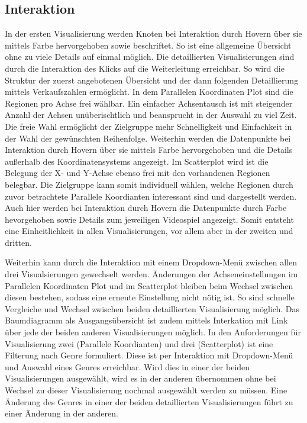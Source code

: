 \documentclass[usegeometry=true]{scrartcl}
\begin{document}
\subsection{Interaktion}
In der ersten Visualisierung werden Knoten bei Interaktion durch Hovern über sie mittels Farbe hervorgehoben sowie beschriftet. 
So ist eine allgemeine Übersicht ohne zu viele Details auf einmal möglich.
Die detaillierten Visualisierungen sind durch die Interaktion des Klicks auf die Weiterleitung erreichbar.
So wird die Struktur der zuerst angebotenen Übersicht und der dann folgenden Detaillierung mittels Verkaufszahlen ermöglicht. 
In dem Parallelen Koordinaten Plot sind die Regionen pro Achse frei wählbar. 
Ein einfacher Achsentausch ist mit steigender Anzahl der Achsen unüberischtlich und beansprucht in der Auswahl zu viel Zeit.
Die freie Wahl ermöglicht der Zielgruppe mehr Schnelligkeit und Einfachkeit in der Wahl der gewünschten Reihenfolge. 
Weiterhin werden die Datenpunkte bei Interaktion durch Hovern über sie mittels Farbe hervorgehoben und die Details außerhalb des Koordinatensystems angezeigt.
Im Scatterplot wird ist die Belegung der X- und Y-Achse ebenso frei mit den vorhandenen Regionen belegbar.
Die Zielgruppe kann somit individuell wählen, welche Regionen durch zuvor betrachtete Parallele Koordianten interessant sind und dargestellt werden. 
Auch hier werden bei Interaktion durch Hovern die Datenpunkte durch Farbe hevorgehoben sowie Details zum jeweiligen Videospiel angezeigt. 
Somit entsteht eine Einheitlichkeit in allen Visualisierungen, vor allem aber in der zweiten und dritten. 

Weiterhin kann durch die Interaktion mit einem Dropdown-Menü zwischen allen drei Visualsierungen gewechselt werden. 
Änderungen der Achseneinstellungen im Parallelen Koordinaten Plot und im Scatterplot bleiben beim Wechsel zwischen diesen bestehen, sodass eine erneute Einstellung nicht nötig ist. 
So sind schnelle Vergleiche und Wechsel zwischen beiden detaillierten Visualisierung möglich. 
Das Baumdiagramm als Ausgangsübersicht ist zudem mittels Interkation mit Link über jede der beiden anderen Visualisierungen möglich.
In den Anforderungen für Visualisierung zwei (Parallele Koordianten) und drei (Scatterplot) ist eine Filterung nach Genre formuliert. 
Diese ist per Interaktion mit Dropdown-Menü und Auswahl eines Genres erreichbar. 
Wird dies in einer der beiden Visualisierungen ausgewählt, wird es in der anderen übernommen ohne bei Wechsel zu dieser Visualisierung nochmal ausgewählt werden zu müssen.
Eine Änderung des Genres in einer der beiden detaillierten Visualisierungen führt zu einer Änderung in der anderen.
\end{document}
